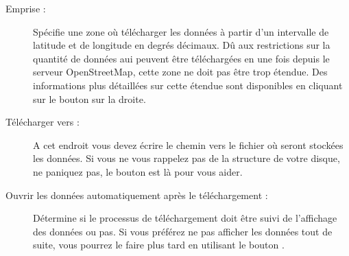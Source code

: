 \begin{description}
\item[Emprise :] Spécifie une zone où télécharger les données à partir d'un intervalle de latitude et de longitude en degrés décimaux. Dû aux restrictions sur la quantité de données aui peuvent être téléchargées en une fois depuis le serveur OpenStreetMap, cette zone ne doit pas être trop étendue. Des informations plus détaillées sur cette étendue sont disponibles en cliquant sur le bouton  sur la droite.
\item[Télécharger vers :] A cet endroit vous devez écrire le chemin vers le fichier où seront stockées les données. Si vous ne vous rappelez pas de la structure de votre disque, ne paniquez pas, le bouton  est là pour vous aider.
\item[Ouvrir les données automatiquement après le téléchargement :] Détermine si le processus de téléchargement doit être suivi de l'affichage des données ou pas. Si vous préférez ne pas afficher les données tout de suite, vous pourrez le faire plus tard en utilisant le bouton .

\end{description}
